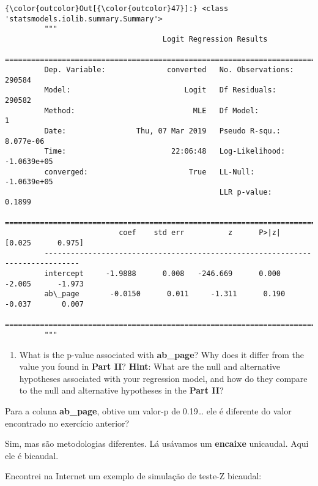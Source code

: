 \documentclass[11pt]{article}
\providecommand{\tightlist}{%
      \setlength{\itemsep}{0pt}\setlength{\parskip}{0pt}}
\begin{document}
\begin{Verbatim}[commandchars=\\\{\}]
{\color{outcolor}Out[{\color{outcolor}47}]:} <class 'statsmodels.iolib.summary.Summary'>
         """
                                    Logit Regression Results                           
         ==============================================================================
         Dep. Variable:              converted   No. Observations:               290584
         Model:                          Logit   Df Residuals:                   290582
         Method:                           MLE   Df Model:                            1
         Date:                Thu, 07 Mar 2019   Pseudo R-squ.:               8.077e-06
         Time:                        22:06:48   Log-Likelihood:            -1.0639e+05
         converged:                       True   LL-Null:                   -1.0639e+05
                                                 LLR p-value:                    0.1899
         ==============================================================================
                          coef    std err          z      P>|z|      [0.025      0.975]
         ------------------------------------------------------------------------------
         intercept     -1.9888      0.008   -246.669      0.000      -2.005      -1.973
         ab\_page       -0.0150      0.011     -1.311      0.190      -0.037       0.007
         ==============================================================================
         """
\end{Verbatim}
            
    \begin{enumerate}
\def\labelenumi{\alph{enumi}.}
\setcounter{enumi}{4}
\tightlist
\item
  What is the p-value associated with \textbf{ab\_page}? Why does it
  differ from the value you found in \textbf{Part II}? \textbf{Hint}:
  What are the null and alternative hypotheses associated with your
  regression model, and how do they compare to the null and alternative
  hypotheses in the \textbf{Part II}?
\end{enumerate}

    Para a coluna \textbf{ab\_page}, obtive um valor-p de 0.19\ldots{} ele é
diferente do valor encontrado no exercício anterior?

Sim, mas são metodologias diferentes. Lá usávamos um \textbf{encaixe}
unicaudal. Aqui ele é bicaudal.

    Encontrei na Internet um exemplo de simulação de teste-Z bicaudal:
\end{document}
